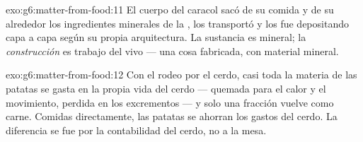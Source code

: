 \begin{solution}{exo:g6:matter-from-food:11}
El cuerpo del caracol sacó de su comida y de su alrededor los
ingredientes minerales de la , los transportó y los fue
depositando capa a capa según su propia arquitectura. La sustancia es
mineral; la \emph{construcción} es trabajo del  vivo --- una cosa
fabricada, con material mineral.
\end{solution}

\begin{solution}{exo:g6:matter-from-food:12}
Con el rodeo por el cerdo, casi toda la materia de las patatas se gasta
en la propia vida del cerdo --- quemada para el calor y el movimiento,
perdida en los excrementos --- y solo una fracción vuelve como carne.
Comidas directamente, las patatas se ahorran los gastos del cerdo. La
diferencia se fue por la contabilidad del cerdo, no a la mesa.
\end{solution}

